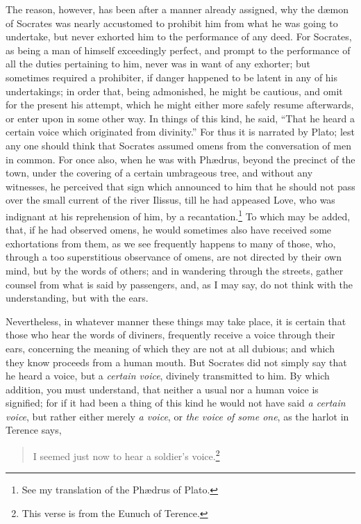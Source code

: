 \documentclass{article}
\begin{document}
The reason, however, has been after a manner already assigned, why the
d{\ae}mon of Socrates was nearly accustomed to prohibit him from what he was
going to undertake, but never exhorted him to the performance of any deed. For
Socrates, as being a man of himself exceedingly perfect, and prompt to the
performance of all the duties pertaining to him, never was in want of any
exhorter; but sometimes required a prohibiter, if danger happened to be latent
in any of his undertakings; in order that, being admonished, he might be
cautious, and omit for the present his attempt, which he might either more
safely resume afterwards, or enter upon in some other way. In things of this
kind, he said, ``That he heard a certain voice which originated from
divinity.'' For thus it is narrated by Plato; lest any one should think that
Socrates assumed omens from the conversation of men in common. For once also,
when he was with Ph{\ae}drus, beyond the precinct of the town, under the
covering of a certain umbrageous tree, and without any witnesses, he perceived
that sign which announced to him that he should not pass over the small current
of the river Ilissus, till he had appeased Love, who was indignant at his
reprehension of him, by a recantation.\footnote{See my translation of the
Ph{\ae}drus of Plato.} To which may be added, that, if he had observed
omens, he would sometimes also have received some exhortations from them, as we
see frequently happens to many of those, who, through a too superstitious
observance of omens, are not directed by their own mind, but by the words of
others; and in wandering through the streets, gather counsel from what is said
by passengers, and, as I may say, do not think with the understanding, but with
the ears.

Nevertheless, in whatever manner these things may take place, it is certain
that those who hear the words of diviners, frequently receive a voice through
their ears, concerning the meaning of which they are not at all dubious; and
which they know proceeds from a human mouth. But Socrates did not simply say
that he heard a voice, but a \textit{certain voice}, divinely transmitted to
him.  By which addition, you must understand, that neither a usual nor a human
voice is signified; for if it had been a thing of this kind he would not have
said \textit{a certain voice}, but rather either merely \textit{a voice}, or
\textit{the voice of some one}, as the harlot in Terence says,

\begin{verse}
I seemed just now to hear a soldier's voice.\footnote{This verse is from the
Eunuch of Terence.}
\end{verse}
\end{document}
